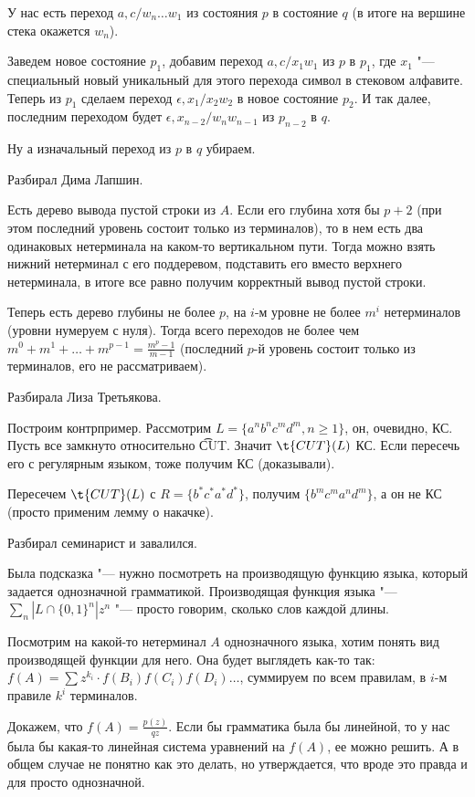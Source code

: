 У нас есть переход $a, c/w_n\dots w_1$ из состояния $p$ в состояние $q$  (в итоге на вершине стека окажется $w_n$).

Заведем новое состояние $p_1$, добавим переход $a, c/x_1w_1$ из $p$ в $p_1$, где $x_1$ "--- специальный новый уникальный для этого перехода символ в стековом алфавите.
Теперь из $p_1$ сделаем переход $\epsilon, x_1/x_2w_2$ в новое состояние $p_2$. И так далее, последним переходом будет $\epsilon, x_{n-2}/w_n w_{n-1}$ из $p_{n-2}$ в $q$.

Ну а изначальный переход из $p$ в $q$ убираем.

Разбирал Дима Лапшин.

Есть дерево вывода пустой строки из $A$. Если его глубина хотя бы $p + 2$ (при этом последний уровень состоит только из терминалов), то в нем есть два одинаковых нетерминала на каком-то вертикальном пути. 
Тогда можно взять нижний нетерминал с его поддеревом, подставить его вместо верхнего нетерминала, в итоге все равно получим корректный вывод пустой строки.

Теперь есть дерево глубины не более $p$, на $i$-м уровне не более $m^i$ нетерминалов (уровни нумеруем с нуля). 
Тогда всего переходов не более чем $m^0 + m^1 + \dots + m^{p-1} = \frac{m^p - 1}{m - 1}$ (последний $p$-й уровень состоит только из терминалов, его не рассматриваем).

Разбирала Лиза Третьякова.

Построим контрпример. Рассмотрим $L = \{a^n b^n c^m d^m, n \geq 1\}$, он, очевидно, КС. Пусть все замкнуто относительно \t{CUT}. 
Значит $\t{CUT}(L)$ КС. Если пересечь его с регулярным языком, тоже получим КС (доказывали).

Пересечем $\t{CUT}(L)$ с $R = \{b^* c^* a^* d^*\}$, получим $\{b^m c^m a^n d^m\}$, а он не КС (просто применим лемму о накачке).

Разбирал семинарист и завалился.

Была подсказка "--- нужно посмотреть на производящую функцию языка, который задается однозначной грамматикой.
Производящая функция языка "--- $\sum \limits_n | L \cap \{0, 1\}^n | z^n$ "--- просто говорим, сколько слов каждой длины.

Посмотрим на какой-то нетерминал $A$ однозначного языка, хотим понять вид производящей функции для него.
Она будет выглядеть как-то так: $f(A) = \sum z^{k_i} \cdot f(B_i) f(C_i) f(D_i) \dots$, суммируем по всем правилам, в $i$-м правиле $k^i$ терминалов.

Докажем, что $f(A) = \frac{p(z)}{q{z}}$. Если бы грамматика была бы линейной, то у нас была бы какая-то линейная система уравнений на $f(A)$, ее можно решить.
А в общем случае не понятно как это делать, но утверждается, что вроде это правда и для просто однозначной.

